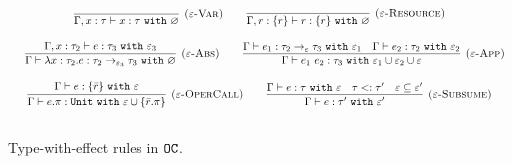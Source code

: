 \begin{figure}[h]

\noindent
{}

\[
\begin{array}{c}

\infer[\textsc{($\varepsilon$-Var)}]
	{ \Gamma, x:\tau \vdash x: \tau~\kw{with} \varnothing }
	{}
	
	\hspace{5ex}
	
\infer[\textsc{($\varepsilon$-Resource)}]
 	{ \Gamma, r: \{ r \} \vdash r : \{ r \}~\kw{with} \varnothing }
 	{} \\[3ex]
 	
 	~~~
	\infer[\textsc{($\varepsilon$-Abs)}]
	{ \Gamma \vdash \lambda x:\tau_2 . e : \tau_2 \rightarrow_{\varepsilon_3} \tau_3~\kw{with} \varnothing }
	{ \Gamma, x: \tau_2 \vdash e: \tau_3~\kw{with} \varepsilon_3 }
	
	\hspace{5ex}
	
\infer[\textsc{($\varepsilon$-App)}]
	{ \Gamma \vdash e_1~e_2 : \tau_3~\kw{with} \varepsilon_1 \cup \varepsilon_2 \cup \varepsilon  }
	{ \Gamma \vdash e_1: \tau_2 \rightarrow_{\varepsilon} \tau_3~\kw{with} \varepsilon_1 & \Gamma \vdash e_2: \tau_2~\kw{with} \varepsilon_2 } \\[3ex]
	
\infer[\textsc{($\varepsilon$-OperCall)}]
	{ \Gamma \vdash e.\pi: \kw{Unit} \kw{with} \varepsilon \cup \{ \bar r.\pi \} }
	{ \Gamma \vdash e: \{ \bar r \}~ \kw{with} \varepsilon}

	\hspace{5ex}
    
\infer[\textsc{($\varepsilon$-Subsume)}]
	{ \Gamma \vdash e: \tau' ~\kw{with} \varepsilon'}
	{ \Gamma \vdash e: \tau ~\kw{with} \varepsilon & \tau <: \tau' & \varepsilon \subseteq \varepsilon'}\\[3ex]
	
\end{array}
\]


\vspace{-7pt}
\caption{Type-with-effect rules in $\mathtt{OC}$.}
\label{fig:opercalc_static_rules}
\end{figure}



